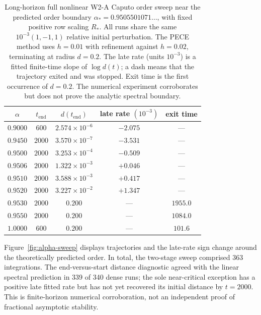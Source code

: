 \begin{table}[!htbp]
\centering
\caption{Long-horizon full nonlinear W2-A Caputo order sweep near
the predicted order boundary \(\alpha_*=0.9505501071\ldots\),
with fixed positive row scaling \(R_*\).
All runs share the same \(10^{-3}(1,-1,1)\) relative initial
perturbation. The PECE method uses \(h=0.01\) with refinement
against \(h=0.02\), terminating at radius \(d=0.2\).
The late rate (units \(10^{-3}\)) is a fitted
finite-time slope of \(\log d(t)\); a dash means that the
trajectory exited and was stopped.
Exit time is the first occurrence of \(d=0.2\).
The numerical experiment corroborates but does not prove
the analytic spectral boundary.}
\label{tab:order-scan}
\begin{tabular}{ccccc}
\toprule
\(\alpha\) & \(t_{\mathrm{end}}\) & \(d(t_{\mathrm{end}})\) &
late rate \((10^{-3})\) & exit time \\
\midrule
\(0.9000\) & \(600\) & \(2.574\times10^{-6}\) & \(-2.075\) & ---\\
\(0.9450\) & \(2000\) & \(3.570\times10^{-7}\) & \(-3.531\) & ---\\
\(0.9500\) & \(2000\) & \(3.253\times10^{-4}\) & \(-0.509\) & ---\\
\(0.9506\) & \(2000\) & \(1.322\times10^{-3}\) & \(+0.046\) & ---\\
\(0.9510\) & \(2000\) & \(3.588\times10^{-3}\) & \(+0.417\) & ---\\
\(0.9520\) & \(2000\) & \(3.227\times10^{-2}\) & \(+1.347\) & ---\\
\(0.9530\) & \(2000\) & \(0.200\) & --- & \(1955.0\)\\
\(0.9550\) & \(2000\) & \(0.200\) & --- & \(1084.0\)\\
\(1.0000\) & \(600\) & \(0.200\) & --- & \(101.6\)\\
\bottomrule
\end{tabular}
\end{table}

Figure~\ref{fig:alpha-sweep} displays trajectories and the
late-rate sign change around the theoretically predicted order.
In total, the two-stage sweep comprised 363 integrations.
The end-versus-start distance diagnostic agreed with the
linear spectral prediction in 339 of 340 dense runs;
the sole near-critical exception has a positive late fitted
rate but has not yet recovered its initial distance by \(t=2000\).
This is finite-horizon numerical corroboration, not an
independent proof of fractional asymptotic stability.


